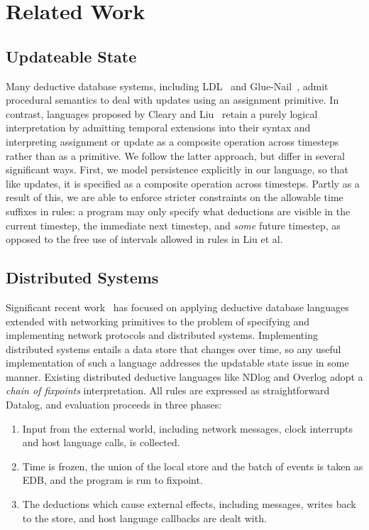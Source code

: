 \section{Related Work}

\subsection{Updateable State}

Many deductive database systems, including LDL~\cite{ldl} and Glue-Nail~\cite{glue-nail}, admit procedural semantics to deal with updates using an
assignment primitive.  In contrast, languages proposed by Cleary and Liu~\cite{deductiveupdates, starlog, harmful} retain a purely logical 
interpretation by admitting temporal extensions into their syntax and interpreting assignment or update as a composite operation
across timesteps~\cite{deductiveupdates} rather than as a primitive.  We follow the latter approach, but differ in several significant ways.
First, we model persistence explicitly in our language, so that like updates, it is specified as a composite operation across timesteps.
Partly as a result of this, we are able to enforce stricter constraints on the allowable time suffixes in rules: a program may only specify what deductions are visible
in the current timestep, the immediate next timestep, and \emph{some} future timestep, as opposed to the free use of intervals allowed in rules in Liu et al.


\subsection{Distributed Systems}

Significant recent work~\cite{boon, p2, loo-sigmod06, boom-techr} has focused on applying deductive database languages extended with networking 
primitives to the problem of specifying and implementing network protocols and distributed systems.  Implementing distributed systems entails 
a data store that changes over time, so any useful implementation of such a language addresses the updatable state issue in some manner. 
Existing distributed deductive languages like NDlog and Overlog adopt a \emph{chain of fixpoints} interpretation.  All rules are expressed as 
straightforward Datalog, and evaluation proceeds in three phases:

\begin{enumerate}
\item Input from the external world, including network messages, clock interrupts and host language calls, is collected.
\item Time is frozen, the union of the local store and the batch of events is taken as EDB, and the program is run to fixpoint.
\item The deductions which cause external effects, including messages, writes back to the store, and host language callbacks are dealt with.  
\end{enumerate}

